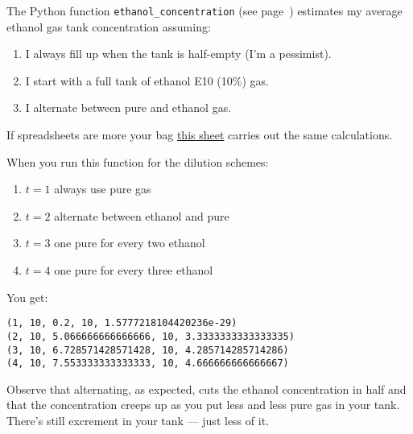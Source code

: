 The Python function \texttt{ethanol\_concentration}  (see page~\pageref{src:eegt7742}) estimates my
average ethanol gas tank concentration assuming:

\begin{enumerate}
\def\labelenumi{\arabic{enumi}.}
\tightlist
\item
  I always fill up when the tank is half-empty (I'm a pessimist).
\item
  I start with a full tank of ethanol E10 (10\%) gas.
\item
  I alternate between pure and ethanol gas.
\end{enumerate}

If spreadsheets are more your bag \href{https://bakerjd99.files.wordpress.com/2023/01/eigt.xlsx}{this sheet} carries out the same
calculations. 

When you run this function for the dilution schemes:

\begin{enumerate}
\def\labelenumi{\arabic{enumi}.}
\tightlist
\item $t = 1$  always use pure gas
\item $t = 2$  alternate between ethanol and pure
\item $t = 3$  one pure for every two ethanol
\item $t = 4$  one pure for every three ethanol
\end{enumerate}

\begin{Shaded}
\begin{Highlighting}[]
\OperatorTok{=}   
\OperatorTok{=}    
 \NormalTok{(}\NormalTok{):}
    \OperatorTok{+}\NormalTok{))}
\end{Highlighting}
\end{Shaded}

You get:

\begin{verbatim}
(1, 10, 0.2, 10, 1.5777218104420236e-29)
(2, 10, 5.066666666666666, 10, 3.3333333333333335)
(3, 10, 6.728571428571428, 10, 4.285714285714286)
(4, 10, 7.553333333333333, 10, 4.666666666666667)
\end{verbatim}

Observe that alternating, as expected, cuts the ethanol concentration in
half and that the concentration creeps up as you put less and less pure
gas in your tank. There's still excrement in your tank --- just less of
it.

